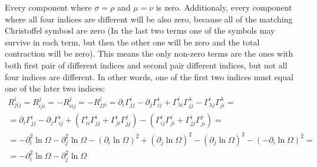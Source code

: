 \documentclass{article}
\begin{document}
Every component where $\sigma = \rho$ and $\mu = \nu$ is zero. Additionaly, every component where all four indices are different will be also zero, because all of the matching Christoffel symbosl are zero (In the last two terms one of the symbols may survive in each term, but then the other one will be zero and the total contraction will be zero). This means the only non-zero terms are the ones with both first pair of different indices and second pair different indices, but not all four indices are different. In other words, one of the first two indices must equal one of the later two indices:
\begin{equation}
\begin{gathered}
    R^i_{jij} = R^j_{iji} = -R^j_{iij} = -R^i_{jji} = \partial_i \Gamma^i_{jj} - \partial_j \Gamma^i_{ij} + \Gamma^i_{\lambda i}\Gamma^\lambda_{jj} - \Gamma^i_{\lambda j}\Gamma^\lambda_{ji} = \\ =
    \partial_i \Gamma^i_{jj} - \partial_j \Gamma^i_{ij} + (\Gamma^i_{ii}\Gamma^i_{jj} + \Gamma^i_{ji}\Gamma^j_{jj}) - (\Gamma^i_{ij}\Gamma^i_{ji} + \Gamma^i_{jj}\Gamma^j_{ji}) = \\ =
    -\partial^2_i \ln\Omega - \partial^2_j \ln \Omega - (\partial_i \ln \Omega)^2 + (\partial_j \ln \Omega)^2 - (\partial_j \ln \Omega)^2 - (-\partial_i \ln \Omega)^2 = \\ =
    -\partial^2_i \ln\Omega - \partial^2_j \ln \Omega
\end{gathered}
\end{equation}
\end{document}
